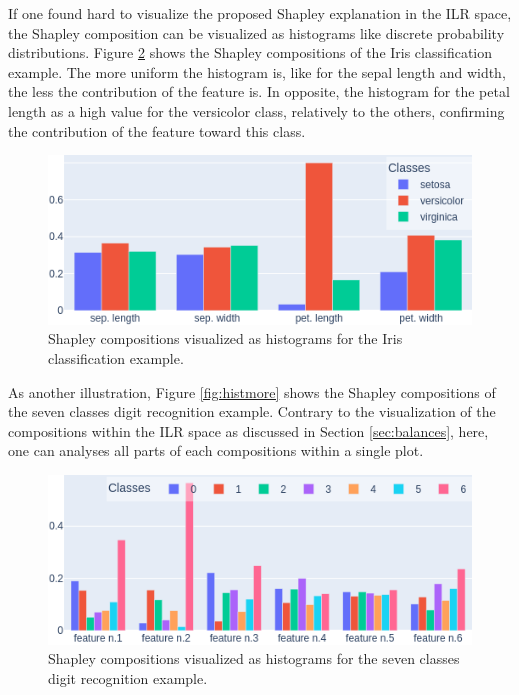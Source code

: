 \documentclass{article}
\theoremstyle{plain}
\theoremstyle{definition}
\theoremstyle{remark}
\begin{document}
If one found hard to visualize the proposed Shapley explanation in the ILR space, the Shapley composition can be visualized as histograms like discrete probability distributions. Figure \ref{fig:histiris} shows the Shapley compositions of the Iris classification example. The more uniform the histogram is, like for the sepal length and width, the less the contribution of the feature is. In opposite, the histogram for the petal length as a high value for the versicolor class, relatively to the others, confirming the contribution of the feature toward this class.
\begin{figure}
  \centering
  \includegraphics[width=\linewidth]{figures/3classes/histo}
  \caption{Shapley compositions visualized as histograms for the Iris classification example.}
  \label{fig:histiris}
\end{figure}
As another illustration, Figure \ref{fig:histmore} shows the Shapley compositions of the seven classes digit recognition example. Contrary to the visualization of the compositions within the ILR space as discussed in Section \ref{sec:balances}, here, one can analyses all parts of each compositions within a single plot.
\begin{figure}
  \centering
  \includegraphics[width=\linewidth]{figures/moreclasses/histo}
  \caption{Shapley compositions visualized as histograms for the seven classes digit recognition example.}
  \label{fig:histiris}
\end{figure}
\end{document}
